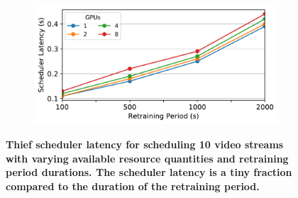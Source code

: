 \begin{figure}
  \centering
  \begin{subfigure}[t]{\linewidth}
    \centering
    \includegraphics[width=\linewidth]{results/sensitivity/scheduler_resourcetime.pdf}
  \end{subfigure}
  \caption{\bf Thief scheduler latency for scheduling 10 video streams with varying available resource quantities and retraining period durations. The scheduler latency is a tiny fraction compared to the duration of the retraining period.  }
  \label{fig:sensitivity-schedlatency}
\end{figure}


